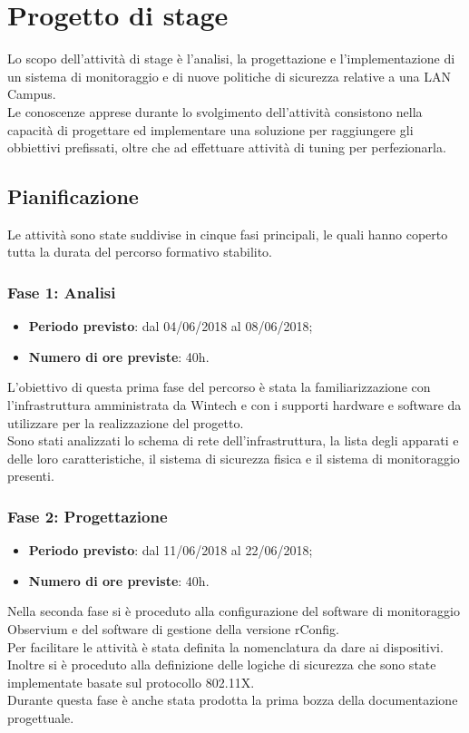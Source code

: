 \documentclass[Tesi.tex]{subfiles}
\begin{document}
\chapter{Progetto di stage}
Lo scopo dell'attività di stage è l’analisi, la progettazione e l'implementazione di un sistema di monitoraggio e di nuove politiche di sicurezza relative a una LAN Campus. \\
Le conoscenze apprese durante lo svolgimento dell'attività consistono nella capacità di progettare ed implementare una soluzione per raggiungere gli obbiettivi prefissati, oltre che ad effettuare attività di tuning per perfezionarla.


\section{Pianificazione}
Le attività sono state suddivise in cinque fasi principali, le quali hanno coperto tutta la durata del percorso formativo stabilito.

\subsection{Fase 1: Analisi}
\begin{itemize}
	\item \textbf{Periodo previsto}: dal 04/06/2018 al 08/06/2018;
	\item \textbf{Numero di ore previste}: 40h.
\end{itemize}

L'obiettivo di questa prima fase del percorso è stata la familiarizzazione con l'infrastruttura amministrata da Wintech e con i supporti hardware e software da utilizzare per la realizzazione del progetto. \\
Sono stati analizzati lo schema di rete dell'infrastruttura, la lista degli apparati e delle loro caratteristiche, il sistema di sicurezza fisica e il sistema di monitoraggio presenti. 

\newpage
\subsection{Fase 2: Progettazione}
\begin{itemize}
	\item \textbf{Periodo previsto}: dal 11/06/2018 al 22/06/2018;
	\item \textbf{Numero di ore previste}: 40h.
\end{itemize}
	
Nella seconda fase si è proceduto alla configurazione del software di monitoraggio Observium e del software di gestione della versione rConfig. \\
Per facilitare le attività è stata definita la nomenclatura da dare ai dispositivi.\\
Inoltre si è proceduto alla definizione delle logiche di sicurezza che sono state implementate basate sul protocollo 802.11X. \\
Durante questa fase è anche stata prodotta la prima bozza della documentazione progettuale.
	
\end{document}
